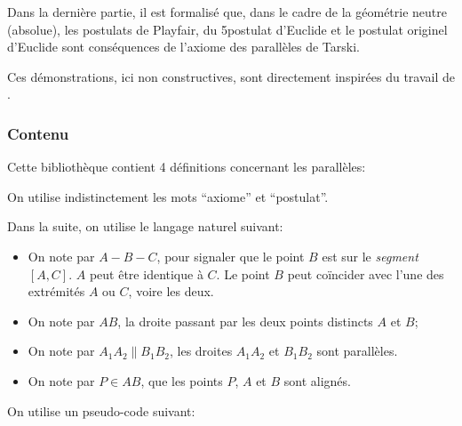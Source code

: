 \documentclass[8pt,a4paper]{article}
\theoremstyle{plain}
\begin{document}

Dans la dernière partie, il est formalisé que, dans le cadre de la géométrie neutre (absolue),
les postulats de Playfair, du 5\ieme postulat d'Euclide et le postulat originel d'Euclide sont conséquences de 
l'axiome des parallèles de Tarski.

Ces démonstrations, ici non constructives, sont directement inspirées du travail de 
\cite{gries:hal-01228612,boutry:hal-01178236}.

\subsubsection{Contenu}


Cette bibliothèque
contient 4 définitions concernant les parallèles:

On utilise indistinctement les mots ``axiome'' et ``postulat''.

Dans la suite, on utilise le langage naturel suivant:
\begin{itemize}
\item On note par $A-B-C$, pour signaler que le point $B$ est sur le \textit{segment} $[A,C]$. $A$ peut être identique à $C$.
  Le point $B$ peut coïncider avec l'une des extrémités $A$ ou $C$, voire les deux.
  
\item On note par $AB$, la droite passant par les deux points distincts $A$ et $B$;
\item On note par $A_1A_2\parallel B_1B_2$, les droites $A_1A_2$ et $B_1B_2$ sont parallèles.
\item On note par $P \in AB$, que les points $P$, $A$ et $B$ sont alignés.
 
\end{itemize}
On utilise un pseudo-code suivant:
\end{document}
